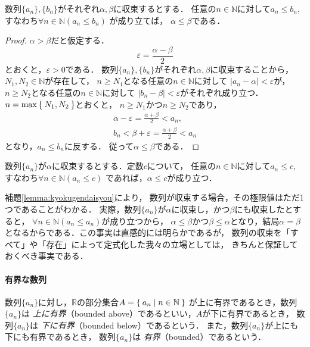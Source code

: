      \begin{lemma} \label{lemma:kyokugendaisyou}
       数列$\{ a_n \} ,  \{ b_n \}$がそれぞれ$\alpha ,  \beta$に収束するとする．
       任意の$n \in \mathbb{N}$に対して$a_n \leq b_n,$
       すなわち$\forall n \in \mathbb{N}(a_n \leq b_n)$
       が成り立てば，
       $\alpha \leq \beta$である．
     \end{lemma}
     \begin{proof}
       $\alpha > \beta$だと仮定する．
       \[
         \varepsilon = \frac{ \alpha - \beta}{2}
       \]
       とおくと，$\varepsilon > 0$である．
       数列$\{ a_n \},  \{ b_n \}$がそれぞれ$\alpha ,  \beta$に収束することから，
       $N_1 ,  N_2 \in \mathbb{N}$が存在して，
       $n \geq N_1$となる任意の$n \in \mathbb{N}$に対して
       $\lvert a_n - \alpha \rvert < \varepsilon $が，
       $n \geq N_2$となる任意の$n \in \mathbb{N}$に対して
       $ \lvert b_n - \beta \rvert < \varepsilon $がそれぞれ成り立つ．
       $n = \max \Set{ N_1 ,  N_2 }$とおくと，
       $n \geq N_1$かつ$n \geq N_2$であり，
       \begin{align*}
         \alpha - \varepsilon = \frac{ \alpha + \beta }{2} < a_n , \\
         b_n < \beta + \varepsilon = \frac{ \alpha + \beta }{2} < a_n
       \end{align*}
       となり，$a_n \leq b_n$に反する．
       従って$\alpha \leq \beta$である．
     \end{proof}

     \begin{coro}
       数列$\{ a_n \}$が$\alpha$に収束するとする．定数$c$について，
       任意の$n \in \mathbb{N}$に対して$a_n \leq c,$
       すなわち$\forall n \in \mathbb{N} (a_n \leq c )$
       であれば，$\alpha \leq c$が成り立つ．
     \end{coro}

     補題\ref{lemma:kyokugendaisyou}により，
     数列が収束する場合，その極限値はただ1つであることがわかる．
     実際，数列$\{ a_n \}$が$\alpha$に収束し，かつ$\beta$にも収束したとすると，
     $\forall n \in \mathbb{N} ( a_n \leq a_n)$が成り立つから，
     $\alpha \leq \beta$かつ$\beta \leq \alpha$となり，結局$\alpha = \beta$
     となるからである．この事実は直感的には明らかであるが，
     数列の収束を「すべて」や「存在」によって定式化した我々の立場としては，
     きちんと保証しておくべき事実である．
    \paragraph{有界な数列}
     数列$\{ a_n \}$に対し，$\mathbb{R}$の部分集合$A=\Set{ a_n \mid n \in \mathbb{N}}$
     が上に有界であるとき，数列$\{ a_n \}$は
     \emph{上に有界}（bounded above）であるといい，$A$が下に有界であるとき，
     数列$\{ a_n \}$は
     \emph{下に有界}（bounded below）であるという．
     また，数列$\{a_n \}$が上にも下にも有界であるとき，
     数列$\{ a_n \}$は
     \emph{有界}（bounded）であるという．

